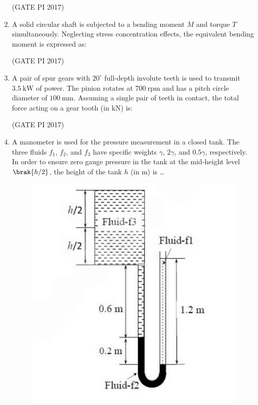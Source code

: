 \documentclass[journal,12pt,onecolumn]{IEEEtran}
\theoremstyle{remark}
\begin{document}
\begin{enumerate}
\hfill (GATE PI 2017)

\item A solid circular shaft is subjected to a bending moment $M$ and torque $T$ simultaneously. Neglecting stress concentration effects,  
the equivalent bending moment is expressed as:
\begin{enumerate}
\end{enumerate}
\hfill (GATE PI 2017)

\item A pair of spur gears with $20^\circ$ full\--depth involute teeth is used to transmit $3.5 \ \text{kW}$ of power.  
The pinion rotates at $700 \ \text{rpm}$ and has a pitch circle diameter of $100 \ \text{mm}$.  
Assuming a single pair of teeth in contact, the total force acting on a gear tooth (in kN) is:
\begin{enumerate}
\end{enumerate}
\hfill (GATE PI 2017)

\item A manometer is used for the pressure measurement in a closed tank. The three fluids $f_1$, $f_2$, and $f_3$  
have specific weights $\gamma$, $2\gamma$, and $0.5\gamma$, respectively.  
In order to ensure zero gauge pressure in the tank at the mid\--height level $\brak{h/2}$, the height of the tank $h$ (in m) is \dots

\begin{figure}[H]
    \centering
    \includegraphics[width=0.4\columnwidth]{fig5.png}
    \caption{}
    \label{fig:placeholder}
\end{figure}


\end{enumerate}
\end{document}
